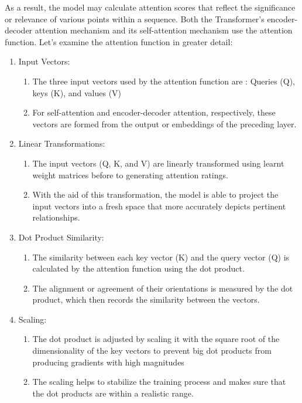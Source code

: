 As a result, the model may calculate attention scores that reflect the significance or relevance of various points within a sequence. Both the Transformer's encoder-decoder attention mechanism and its self-attention mechanism use the attention function. Let's examine the attention function in greater detail:

\begin{enumerate}
    \item Input Vectors:
    \begin{enumerate}
      \item The three input vectors used by the attention function are : Queries (Q), keys (K), and values (V)
        \item For self-attention and encoder-decoder attention, respectively, these vectors are formed from the output or embeddings of the preceding layer.


    \end{enumerate}

    \item Linear Transformations:
    \begin{enumerate}
      \item The input vectors (Q, K, and V) are linearly transformed using learnt weight matrices before to generating attention ratings.
        \item With the aid of this transformation, the model is able to project the input vectors into a fresh space that more accurately depicts pertinent relationships.


    \end{enumerate}

    \item Dot Product Similarity:
    \begin{enumerate}
         \item The similarity between each key vector (K) and the query vector (Q) is calculated by the attention function using the dot product.
        \item The alignment or agreement of their orientations is measured by the dot product, which then records the similarity between the vectors.


    \end{enumerate}

    \item Scaling:
    \begin{enumerate}
       \item The dot product is adjusted by scaling it with the square root of the dimensionality of the key vectors to prevent big dot products from producing gradients with high magnitudes 
        \item The scaling helps to stabilize the training process and makes sure that the dot products are within a realistic range.



\end{enumerate}
\end{enumerate}
